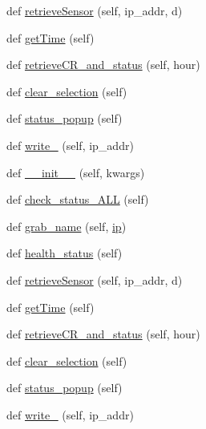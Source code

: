 \begin{DoxyCompactItemize}
\item 
def \hyperlink{classTestingGUI_1_1Health_afde04eeef599765553cce6069cff429e}{retrieve\+Sensor} (self, ip\+\_\+addr, d)
\item 
def \hyperlink{classTestingGUI_1_1Health_ad38efcab164d7bbb4ec16c2086dc7760}{get\+Time} (self)
\item 
def \hyperlink{classTestingGUI_1_1Health_a3a6e2fca0c7a691527b14c79b388f6fd}{retrieve\+C\+R\+\_\+and\+\_\+status} (self, hour)
\item 
def \hyperlink{classTestingGUI_1_1Health_a1e3b9ff5f630c5f6d47bfefe26cfb39b}{clear\+\_\+selection} (self)
\item 
def \hyperlink{classTestingGUI_1_1Health_a06c77fae7dd08337985a3420a2cdbc81}{status\+\_\+popup} (self)
\item 
def \hyperlink{classTestingGUI_1_1Health_a73ccf83145b4adf9452f85a061c23dc9}{write\+\_\+} (self, ip\+\_\+addr)
\item 
def \hyperlink{classTestingGUI_1_1Health_acf40a31363f46003573ea00664734fc3}{\+\_\+\+\_\+init\+\_\+\+\_\+} (self, kwargs)
\item 
def \hyperlink{classTestingGUI_1_1Health_aa382e2bc40e918613d90dbd819974420}{check\+\_\+status\+\_\+\+A\+LL} (self)
\item 
def \hyperlink{classTestingGUI_1_1Health_a236b797764a726c3fe2d68f2fabaceb8}{grab\+\_\+name} (self, \hyperlink{classTestingGUI_1_1Health_a2c897cb32dd28d657ac3f22c64a14543}{ip})
\item 
def \hyperlink{classTestingGUI_1_1Health_ac36ce2de8d9aa5f3b687da2f836f0b3d}{health\+\_\+status} (self)
\item 
def \hyperlink{classTestingGUI_1_1Health_afde04eeef599765553cce6069cff429e}{retrieve\+Sensor} (self, ip\+\_\+addr, d)
\item 
def \hyperlink{classTestingGUI_1_1Health_ad38efcab164d7bbb4ec16c2086dc7760}{get\+Time} (self)
\item 
def \hyperlink{classTestingGUI_1_1Health_a3a6e2fca0c7a691527b14c79b388f6fd}{retrieve\+C\+R\+\_\+and\+\_\+status} (self, hour)
\item 
def \hyperlink{classTestingGUI_1_1Health_a1e3b9ff5f630c5f6d47bfefe26cfb39b}{clear\+\_\+selection} (self)
\item 
def \hyperlink{classTestingGUI_1_1Health_a06c77fae7dd08337985a3420a2cdbc81}{status\+\_\+popup} (self)
\item 
def \hyperlink{classTestingGUI_1_1Health_a73ccf83145b4adf9452f85a061c23dc9}{write\+\_\+} (self, ip\+\_\+addr)
\end{DoxyCompactItemize}

